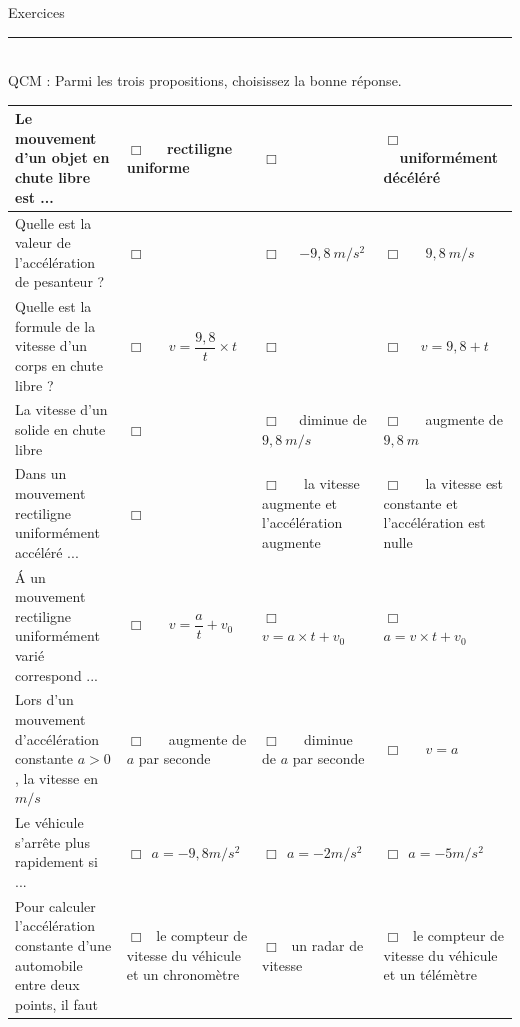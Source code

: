 \documentclass[11pt,a4paper]{article}
\begin{document}
\begin{center}
 \LARGE{Exercices } \\[3mm]
\end{center}



\normalsize

\hrule\
\\[0,5cm]


 QCM : Parmi les trois propositions, choisissez la bonne réponse. 

\begin{center}



    \begin{tabular}{|p{6cm}|C{3cm}|C{3cm}|C{3cm}|}
         \hline
        Le mouvement d'un objet en chute libre est ...& $\Box $ ~~rectiligne uniforme& $\Box $ \color{red}{~~Uniformément accéléré  }  & $\Box $ ~~uniformément décéléré \\
         \hline
       Quelle est la valeur de l'accélération de pesanteur ?  & $\Box $ \color{red}{~~$9,8~m/s^2$ }& $\Box $ ~~$-9,8~m/s^2$  & $\Box $ ~~ $9,8~m/s$ \\
         \hline
          Quelle est la formule de la vitesse d'un corps en chute libre ?  &$\Box $ ~~ $v=\dfrac{9,8}{t} \times t$  &$\Box $ ~~ \color{red}{$v=9,8 \times t$ } & $\Box $ ~~$v=9,8 + t$  \\
         \hline
          La vitesse d'un solide en chute libre & $\Box $ ~~\color{red}{ augmente de $9,8~m/s $} & $\Box $ ~~diminue de $9,8~m/s$ & $\Box $ ~~ augmente de $9,8~m$ \\
         \hline
          Dans un mouvement rectiligne uniformément accéléré ... &$\Box $ ~~ \color{red}{la vitesse augmente et l'accélération est constante} & $\Box $ ~~ la vitesse augmente et l'accélération augmente & $\Box $ ~~ la vitesse est constante et l'accélération est nulle \\
         \hline
         \'A un mouvement rectiligne uniformément varié correspond ... & $\Box $ ~~ $v=\dfrac{a}{t}+v_0$ & $\Box $ ~~  $v=a \times t + v_0$ & $\Box $ ~~  $a=v \times t + v_0$ \\
         \hline
          Lors d'un mouvement d'accélération constante $a>0$, la vitesse en $m/s$ &$\Box$ ~~ augmente de $a$ par seconde & $\Box$ ~~ diminue de $a$ par seconde &$\Box$ ~~ $v=a$ \\
         \hline
          Le véhicule s'arrête plus rapidement si ...  &$\Box ~~ a=-9,8 m/s^2$ &$\Box ~~ a=-2 m/s^2 $  & $\Box ~~ a=-5 m/s^2$ \\ 
         \hline 
          Pour calculer l'accélération constante d'une automobile entre deux points, il faut  &$\Box ~~ $ le compteur de vitesse du véhicule et un chronomètre   &$\Box ~~ $ un radar de vitesse   &$\Box ~~ $ le compteur de vitesse du véhicule et un télémètre \\
         \hline


\end{tabular}
\end{center}
\end{document}

